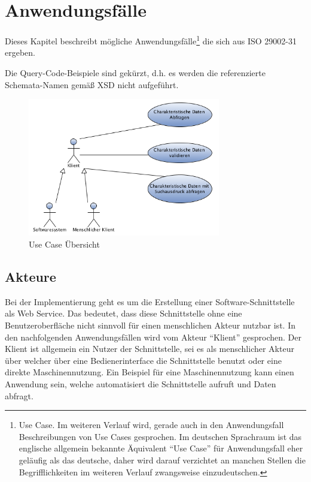 \section{Anwendungsfälle}\label{kap:Use_Cases}

Dieses Kapitel beschreibt mögliche Anwendungsfälle\footnote{Use Case. Im weiteren Verlauf wird, gerade auch in den Anwendungsfall Beschreibungen von Use Cases gesprochen. Im deutschen Sprachraum ist das englische allgemein bekannte Äquivalent \enquote{Use Case} für Anwendungsfall eher geläufig als das deutsche, daher wird darauf verzichtet an manchen Stellen die Begrifflichkeiten im weiteren Verlauf zwangsweise einzudeutschen.} die sich aus ISO 29002-31 ergeben. 


Die Query-Code-Beispiele sind gekürzt, d.h. es werden die referenzierte Schemata-Namen gemäß XSD nicht aufgeführt. 

\begin{figure}[htbp]
	\centering
		\includegraphics[width=0.75\textwidth]{images/usecases_plib.png}
	\caption{Use Case Übersicht}
	\label{fig:usecaseuebersicht}
\end{figure}

\subsection{Akteure}
Bei der Implementierung geht es um die Erstellung einer Software-Schnittstelle als Web Service. Das bedeutet, dass diese Schnittstelle ohne eine Benutzeroberfläche nicht sinnvoll für einen menschlichen Akteur nutzbar ist. In den nachfolgenden Anwendungsfällen wird vom Akteur \enquote{Klient} gesprochen. Der Klient ist allgemein ein Nutzer der Schnittstelle, sei es als menschlicher Akteur über welcher über eine Bedienerinterface die Schnittstelle benutzt oder eine direkte Maschinennutzung. Ein Beispiel für eine Maschinennutzung kann einen Anwendung sein, welche automatisiert die Schnittstelle aufruft und Daten abfragt.    

